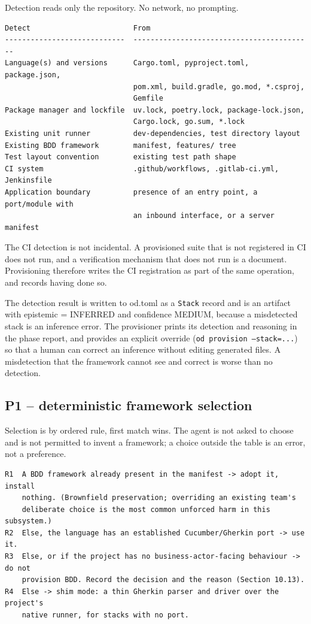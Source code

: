 \documentclass[11pt,a4paper]{article}
\begin{document}
Detection reads only the repository. No network, no prompting.

\begin{Verbatim}[fontsize=\footnotesize,breaklines=true,breakanywhere=true,breakautoindent=false,samepage=false]
Detect                        From
----------------------------  ------------------------------------------
Language(s) and versions      Cargo.toml, pyproject.toml, package.json,
                              pom.xml, build.gradle, go.mod, *.csproj,
                              Gemfile
Package manager and lockfile  uv.lock, poetry.lock, package-lock.json,
                              Cargo.lock, go.sum, *.lock
Existing unit runner          dev-dependencies, test directory layout
Existing BDD framework        manifest, features/ tree
Test layout convention        existing test path shape
CI system                     .github/workflows, .gitlab-ci.yml, Jenkinsfile
Application boundary          presence of an entry point, a port/module with
                              an inbound interface, or a server manifest
\end{Verbatim}

The CI detection is not incidental. A provisioned suite that is not registered in CI does not run, and a verification mechanism that does not run is a document. Provisioning therefore writes the CI registration as part of the same operation, and records having done so.

The detection result is written to od.toml as a \texttt{Stack} record and is an artifact with epistemic = INFERRED and confidence MEDIUM, because a misdetected stack is an inference error. The provisioner prints its detection and reasoning in the phase report, and provides an explicit override (\texttt{od provision --stack=...}) so that a human can correct an inference without editing generated files. A misdetection that the framework cannot see and correct is worse than no detection.

\subsection{P1 -- deterministic framework selection}

Selection is by ordered rule, first match wins. The agent is not asked to choose and is not permitted to invent a framework; a choice outside the table is an error, not a preference.

\begin{Verbatim}[fontsize=\footnotesize,breaklines=true,breakanywhere=true,breakautoindent=false,samepage=false]
R1  A BDD framework already present in the manifest -> adopt it, install
    nothing. (Brownfield preservation; overriding an existing team's
    deliberate choice is the most common unforced harm in this subsystem.)
R2  Else, the language has an established Cucumber/Gherkin port -> use it.
R3  Else, or if the project has no business-actor-facing behaviour -> do not
    provision BDD. Record the decision and the reason (Section 10.13).
R4  Else -> shim mode: a thin Gherkin parser and driver over the project's
    native runner, for stacks with no port.
\end{Verbatim}
\end{document}
